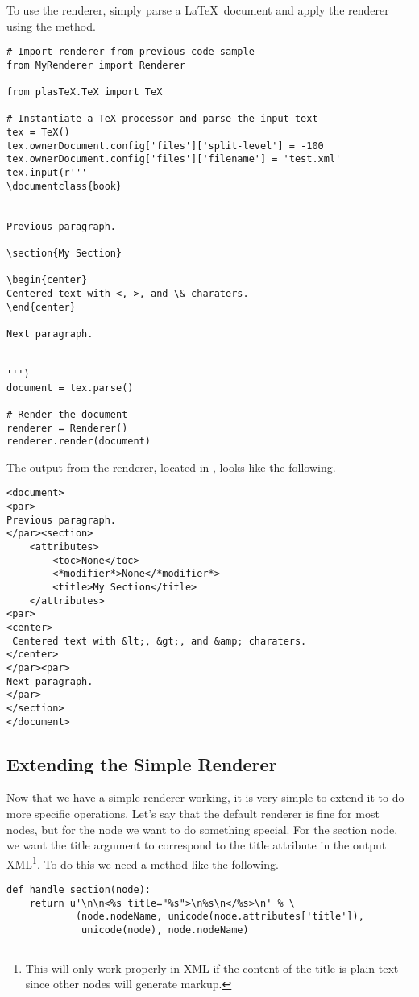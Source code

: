 To use the renderer, simply parse a \LaTeX\ document and apply the renderer
using the  method.
\begin{verbatim}
# Import renderer from previous code sample
from MyRenderer import Renderer

from plasTeX.TeX import TeX

# Instantiate a TeX processor and parse the input text
tex = TeX()
tex.ownerDocument.config['files']['split-level'] = -100
tex.ownerDocument.config['files']['filename'] = 'test.xml'
tex.input(r'''
\documentclass{book}


Previous paragraph.

\section{My Section}

\begin{center}
Centered text with <, >, and \& charaters.
\end{center}

Next paragraph.


''')
document = tex.parse()

# Render the document
renderer = Renderer()
renderer.render(document)
\end{verbatim}

The output from the renderer, located in , looks like the
following.
\begin{verbatim}
<document>
<par>
Previous paragraph.
</par><section>
    <attributes>
        <toc>None</toc>
        <*modifier*>None</*modifier*>
        <title>My Section</title>
    </attributes>
<par>
<center>
 Centered text with &lt;, &gt;, and &amp; charaters.
</center>
</par><par>
Next paragraph.
</par>
</section>
</document>
\end{verbatim}


\subsection{Extending the Simple Renderer}

Now that we have a simple renderer working, it is very simple to extend
it to do more specific operations.  Let's say that the default renderer
is fine for most nodes, but for the  node we want to do
something special.  For the section node, we want the title argument
to correspond to the title attribute in the output XML\footnote{This
will only work properly in XML if the content of the title is plain text
since other nodes will generate markup.}.  To do this we need a 
method like the following.
\begin{verbatim}
def handle_section(node):
    return u'\n\n<%s title="%s">\n%s\n</%s>\n' % \
            (node.nodeName, unicode(node.attributes['title']), 
             unicode(node), node.nodeName)
\end{verbatim}

